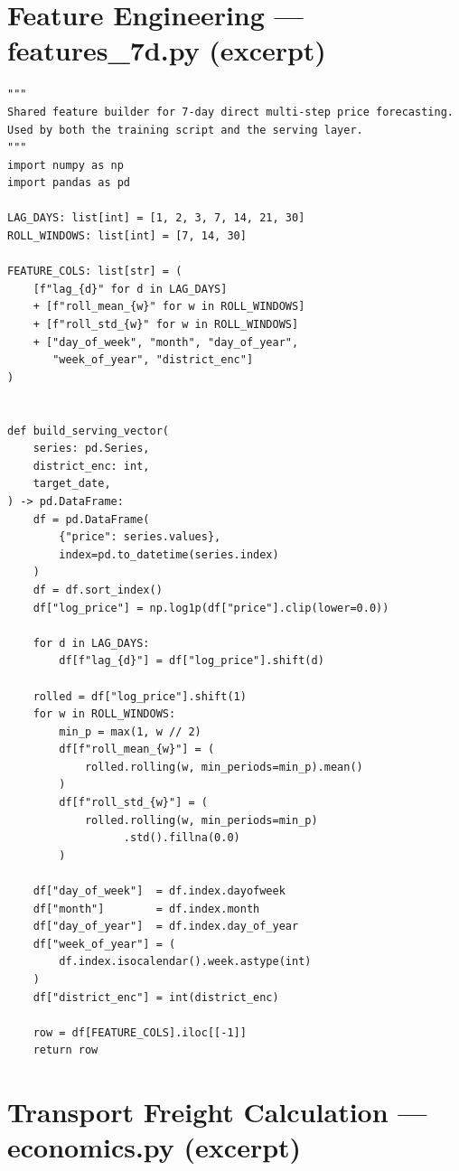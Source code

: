 \documentclass[12pt,a4paper]{report}
\begin{document}
\section{Feature Engineering --- features\_7d.py (excerpt)}

\begin{lstlisting}[caption={Shared feature builder for 7-day XGBoost forecasting}]
"""
Shared feature builder for 7-day direct multi-step price forecasting.
Used by both the training script and the serving layer.
"""
import numpy as np
import pandas as pd

LAG_DAYS: list[int] = [1, 2, 3, 7, 14, 21, 30]
ROLL_WINDOWS: list[int] = [7, 14, 30]

FEATURE_COLS: list[str] = (
    [f"lag_{d}" for d in LAG_DAYS]
    + [f"roll_mean_{w}" for w in ROLL_WINDOWS]
    + [f"roll_std_{w}" for w in ROLL_WINDOWS]
    + ["day_of_week", "month", "day_of_year",
       "week_of_year", "district_enc"]
)


def build_serving_vector(
    series: pd.Series,
    district_enc: int,
    target_date,
) -> pd.DataFrame:
    df = pd.DataFrame(
        {"price": series.values},
        index=pd.to_datetime(series.index)
    )
    df = df.sort_index()
    df["log_price"] = np.log1p(df["price"].clip(lower=0.0))

    for d in LAG_DAYS:
        df[f"lag_{d}"] = df["log_price"].shift(d)

    rolled = df["log_price"].shift(1)
    for w in ROLL_WINDOWS:
        min_p = max(1, w // 2)
        df[f"roll_mean_{w}"] = (
            rolled.rolling(w, min_periods=min_p).mean()
        )
        df[f"roll_std_{w}"] = (
            rolled.rolling(w, min_periods=min_p)
                  .std().fillna(0.0)
        )

    df["day_of_week"]  = df.index.dayofweek
    df["month"]        = df.index.month
    df["day_of_year"]  = df.index.day_of_year
    df["week_of_year"] = (
        df.index.isocalendar().week.astype(int)
    )
    df["district_enc"] = int(district_enc)

    row = df[FEATURE_COLS].iloc[[-1]]
    return row
\end{lstlisting}

\section{Transport Freight Calculation --- economics.py (excerpt)}
\end{document}
